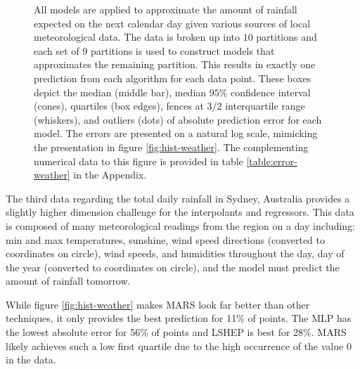 \documentclass[smallextended,final]{svjour3}       %
\begin{document}
\begin{figure}
  \centering
  \caption{All models are applied to approximate the amount of rainfall expected on the next calendar day given various sources of local meteorological data. The data is broken up into $10$ partitions and each set of $9$ partitions is used to construct models that approximates the remaining partition. This results in exactly one prediction from each algorithm for each data point. These boxes depict the median (middle bar), median $95\%$ confidence interval (cones), quartiles (box edges), fences at $3/2$ interquartile range (whiskers), and outliers (dots) of absolute prediction error for each model. The errors are presented on a natural log scale, mimicking the presentation in figure \ref{fig:hist-weather}. The complementing numerical data to this figure is provided in table \ref{table:error-weather} in the Appendix.}
  \label{fig:error-weather}
\end{figure}

The third data regarding the total daily rainfall in Sydney, Australia \cite{williams2009rattle} provides a slightly higher dimension challenge for the interpolants and regressors. This data is composed of many meteorological readings from the region on a day including: min and max temperatures, sunshine, wind speed directions (converted to coordinates on circle), wind speeds, and humidities throughout the day, day of the year (converted to coordinates on circle), and the model must predict the amount of rainfall tomorrow.

While figure \ref{fig:hist-weather} makes MARS look far better than other techniques, it only provides the best prediction for 11\% of points. The MLP has the lowest absolute error for 56\% of points and LSHEP is best for 28\%. MARS likely achieves such a low first quartile due to the high occurrence of the value 0 in the data.
\end{document}
